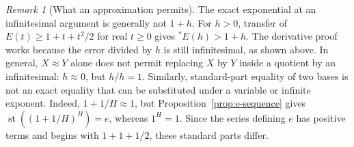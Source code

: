 \documentclass[11pt]{article}
\theoremstyle{definition}
\theoremstyle{remark}
\newtheorem{remark}[theorem]{Remark}
\newcommand{\ext}[1]{{}^{*}\!#1}
\DeclareMathOperator{\st}{st}
\begin{document}
\begin{remark}[What an approximation permits]\label{rem:precision}
The exact exponential at an infinitesimal argument is generally not \(1+h\).
For \(h>0\), transfer of \(E(t)\ge1+t+t^2/2\) for real \(t\ge0\) gives
\(\ext E(h)>1+h\). The derivative proof works because the error divided by
\(h\) is still infinitesimal, as shown above.
In general, \(X\approx Y\) alone does not permit replacing \(X\) by \(Y\)
inside a quotient by an infinitesimal: \(h\approx0\), but \(h/h=1\).
Similarly, standard-part equality of two bases is not an exact equality that
can be substituted under a variable or infinite exponent. Indeed,
\(1+1/H\approx1\), but Proposition~\ref{prop:e-sequence} gives
\(\st((1+1/H)^H)=e\), whereas \(1^H=1\). Since the series defining \(e\)
has positive terms and begins with \(1+1+1/2\), these standard parts differ.
\end{remark}
\end{document}
